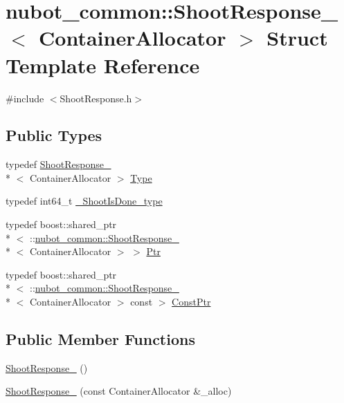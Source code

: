 \hypertarget{structnubot__common_1_1ShootResponse__}{\section{nubot\-\_\-common\-:\-:Shoot\-Response\-\_\-$<$ Container\-Allocator $>$ Struct Template Reference}
\label{structnubot__common_1_1ShootResponse__}
}


{\ttfamily \#include $<$Shoot\-Response.\-h$>$}

\subsection*{Public Types}
\begin{DoxyCompactItemize}
\item 
typedef \hyperlink{structnubot__common_1_1ShootResponse__}{Shoot\-Response\-\_\-}\\*
$<$ Container\-Allocator $>$ \hyperlink{structnubot__common_1_1ShootResponse___a1afd972b3b9a5016f438b957fb90c555}{Type}
\item 
typedef int64\-\_\-t \hyperlink{structnubot__common_1_1ShootResponse___ae0d76787507c62fb03e4e41e8de1b69a}{\-\_\-\-Shoot\-Is\-Done\-\_\-type}
\item 
typedef boost\-::shared\-\_\-ptr\\*
$<$ \-::\hyperlink{structnubot__common_1_1ShootResponse__}{nubot\-\_\-common\-::\-Shoot\-Response\-\_\-}\\*
$<$ Container\-Allocator $>$ $>$ \hyperlink{structnubot__common_1_1ShootResponse___ad767e21cc82b1273dc15a96d92cf1d99}{Ptr}
\item 
typedef boost\-::shared\-\_\-ptr\\*
$<$ \-::\hyperlink{structnubot__common_1_1ShootResponse__}{nubot\-\_\-common\-::\-Shoot\-Response\-\_\-}\\*
$<$ Container\-Allocator $>$ const  $>$ \hyperlink{structnubot__common_1_1ShootResponse___a5b955c6b595bd7dde539a7642782f213}{Const\-Ptr}
\end{DoxyCompactItemize}
\subsection*{Public Member Functions}
\begin{DoxyCompactItemize}
\item 
\hyperlink{structnubot__common_1_1ShootResponse___a357ed5d1b186bc7ad7885a6176520f2e}{Shoot\-Response\-\_\-} ()
\item 
\hyperlink{structnubot__common_1_1ShootResponse___a1b159f522f1a489ecbcb2572f02df93a}{Shoot\-Response\-\_\-} (const Container\-Allocator \&\-\_\-alloc)
\end{DoxyCompactItemize}
